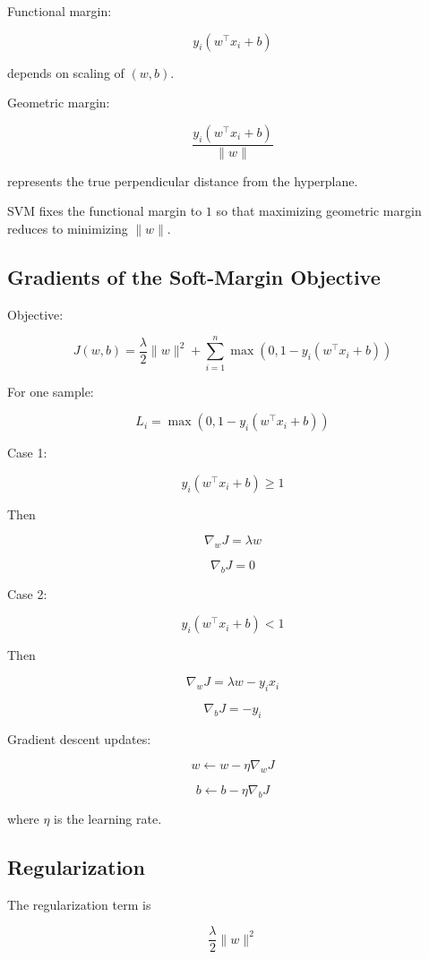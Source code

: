 \documentclass[10pt,a4paper]{article}
\begin{document}
		Functional margin:
		
		\[
		y_i(w^\top x_i+b)
		\]
		
		depends on scaling of $(w,b)$.
		
		Geometric margin:
		
		\[
		\frac{y_i(w^\top x_i+b)}{\|w\|}
		\]
		
		represents the true perpendicular distance from the hyperplane.
		
		SVM fixes the functional margin to $1$ so that maximizing geometric margin reduces to minimizing $\|w\|$.
		
		\subsection{Gradients of the Soft-Margin Objective}
		
		Objective:
		
		\[
		J(w,b)
		=
		\frac{\lambda}{2}\|w\|^2
		+
		\sum_{i=1}^{n}
		\max(0,1-y_i(w^\top x_i+b))
		\]
		
		For one sample:
		
		\[
		L_i=
		\max(0,1-y_i(w^\top x_i+b))
		\]
		
		Case 1:
		
		\[
		y_i(w^\top x_i+b)\ge1
		\]
		
		Then
		
		\[
		\nabla_w J = \lambda w
		\]
		
		\[
		\nabla_b J = 0
		\]
		
		Case 2:
		
		\[
		y_i(w^\top x_i+b)<1
		\]
		
		Then
		
		\[
		\nabla_w J
		=
		\lambda w - y_i x_i
		\]
		
		\[
		\nabla_b J
		=
		-y_i
		\]
		
		Gradient descent updates:
		
		\[
		w \leftarrow w-\eta \nabla_w J
		\]
		
		\[
		b \leftarrow b-\eta \nabla_b J
		\]
		
		where $\eta$ is the learning rate.
		
		\subsection{Regularization}
		
		The regularization term is
		
		\[
		\frac{\lambda}{2}\|w\|^2
		\]
		
\end{document}
